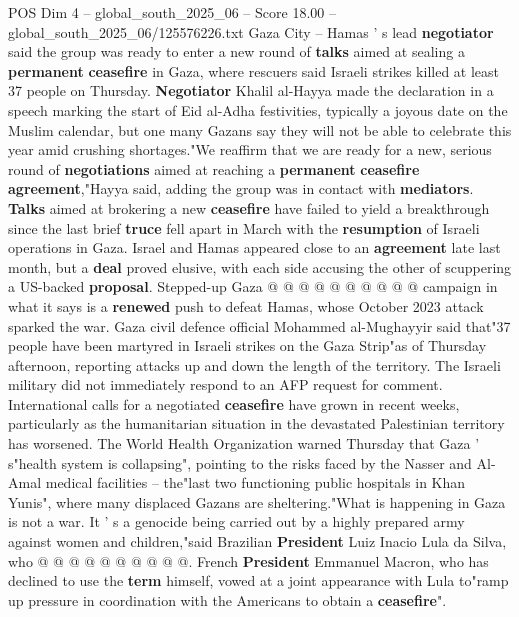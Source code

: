 \begin{textsample}{POS Dim 4 – global\_south\_2025\_06 – Score 18.00 – global\_south\_2025\_06/125576226.txt}  \label{ex:f4_pos_355}
Gaza City -- Hamas ' s lead \textbf{negotiator} said the group was ready to enter a new round of \textbf{talks} aimed at sealing a \textbf{permanent} \textbf{ceasefire} in Gaza, where rescuers said Israeli strikes killed at least 37 people on Thursday. \textbf{Negotiator} Khalil al-Hayya made the declaration in a speech marking the start of Eid al-Adha festivities, typically a joyous date on the Muslim calendar, but one many Gazans say they will not be able to celebrate this year amid crushing shortages."We reaffirm that we are ready for a new, serious round of \textbf{negotiations} aimed at reaching a \textbf{permanent} \textbf{ceasefire} \textbf{agreement},"Hayya said, adding the group was in contact with \textbf{mediators}. \textbf{Talks} aimed at brokering a new \textbf{ceasefire} have failed to yield a breakthrough since the last brief \textbf{truce} fell apart in March with the \textbf{resumption} of Israeli operations in Gaza.
Israel and Hamas appeared close to an \textbf{agreement} late last month, but a \textbf{deal} proved elusive, with each side accusing the other of scuppering a US-backed \textbf{proposal}.
Stepped-up Gaza @ @ @ @ @ @ @ @ @ @ campaign in what it says is a \textbf{renewed} push to defeat Hamas, whose October 2023 attack sparked the war.
Gaza civil defence official Mohammed al-Mughayyir said that"37 people have been martyred in Israeli strikes on the Gaza Strip"as of Thursday afternoon, reporting attacks up and down the length of the territory.
The Israeli military did not immediately respond to an AFP request for comment.
International calls for a negotiated \textbf{ceasefire} have grown in recent weeks, particularly as the humanitarian situation in the devastated Palestinian territory has worsened.
The World Health Organization warned Thursday that Gaza ' s"health system is collapsing", pointing to the risks faced by the Nasser and Al-Amal medical facilities -- the"last two functioning public hospitals in Khan Yunis", where many displaced Gazans are sheltering."What is happening in Gaza is not a war.
It ' s a genocide being carried out by a highly prepared army against women and children,"said Brazilian \textbf{President} Luiz Inacio Lula da Silva, who @ @ @ @ @ @ @ @ @ @.
French \textbf{President} Emmanuel Macron, who has declined to use the \textbf{term} himself, vowed at a joint appearance with Lula to"ramp up pressure in coordination with the Americans to obtain a \textbf{ceasefire}".

\end{textsample}
